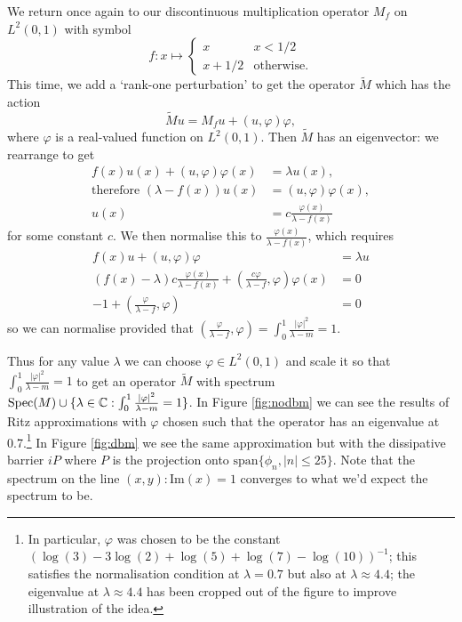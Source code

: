 \documentclass[../main.tex]{subfiles}
\begin{document}
\begin{example} 
  We return once again to our discontinuous multiplication
  operator $M_f$ on $L^2(0, 1)$ with symbol 
    $$
    f: x \mapsto 
    \begin{cases}
      x & x < 1/2\\
      x+1/2 & \text{otherwise}.
    \end{cases} 
    $$
  This time, we add a `rank-one perturbation' to get the operator 
  $\tilde{M}$ which has the action 
    $$\tilde{M}u = M_fu + (u, \varphi) \varphi,$$
  where $\varphi$ is a real-valued function on $L^2(0, 1)$.
  Then $\tilde{M}$ has an eigenvector: we rearrange to get
  \begin{align*} 
    f(x)u(x) + (u, \varphi)\varphi(x) & = \lambda u(x),\\
    \text{therefore }(\lambda - f(x))u(x) & = (u, \varphi)\varphi(x),\\
    u(x) & = c \frac{\varphi(x)}{\lambda - f(x)}
  \end{align*} 
  for some constant $c$. We then normalise this to
  $\frac{\varphi(x)}{\lambda - f(x)}$, which requires 
  \begin{align*}
    f(x)u + (u, \varphi)\varphi & = \lambda u \\
    (f(x) - \lambda)c\frac{\varphi(x)}{\lambda - f(x)} +
    (\frac{c\varphi}{\lambda - f}, \varphi)\varphi(x) & = 0 \\ -1 +
    (\frac{\varphi}{\lambda - f}, \varphi) & = 0 
  \end{align*}
  so we can normalise provided that
  $(\frac{\varphi}{\lambda - f}, \varphi) 
  = \int_0^1 \frac{|\varphi|^2}{\lambda - m} = 1.$
\end{example}

Thus for any value $\lambda$ we can choose $\varphi \in L^2(0, 1)$ and scale it
so that $\int_0^1 \frac{|\varphi|^2}{\lambda - m} = 1$ to get an operator
$\tilde{M}$ with spectrum $\mathrm{Spec}(M) \cup \{\lambda \in \mathbb{C} : \int_0^1
\frac{|\varphi|^2}{\lambda - m} = 1\}$. In Figure \ref{fig:nodbm} we can see the
results of Ritz approximations with $\varphi$ chosen such that the operator has
an eigenvalue at 0.7.\footnote{In particular, $\varphi$ was chosen to be the
constant $(\log(3) - 3\log(2) + \log(5) + \log(7) - \log(10))^{-1}$; this
satisfies the normalisation condition at $\lambda = 0.7$ but also at $\lambda
\approx 4.4$; the eigenvalue at $\lambda \approx 4.4$ has been cropped out of
the figure to improve illustration of the idea.} In Figure \ref{fig:dbm} we see
the same approximation but with the dissipative barrier $iP$ where $P$ is the
projection onto $\mathrm{span}\{\phi_n, |n| \leq 25\}$. Note that the spectrum
on the line ${(x, y) : \mathrm{Im}(x) = 1}$ converges to what we'd expect the
spectrum to be.
\end{document}
